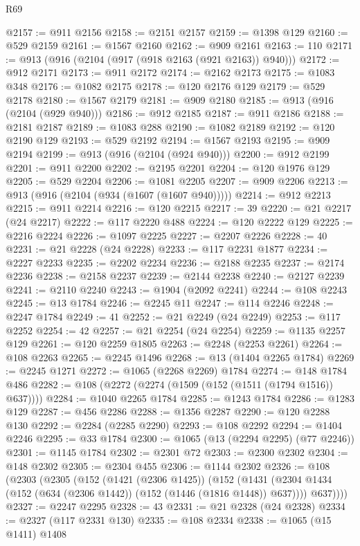 \begin{lexlean}{R69}
\begin{coremodule}
@2157 := @911 @2156
@2158 := @2151 @2157
@2159 := @1398 @129
@2160 := @529 @2159
@2161 := @1567 @2160
@2162 := @909 @2161
@2163 := 110
@2171 := @913 (@916 (@2104 (@917 (@918 @2163 (@921 @2163)) @940)))
@2172 := @912 @2171
@2173 := @911 @2172
@2174 := @2162 @2173
@2175 := @1083 @348
@2176 := @1082 @2175
@2178 := @120 @2176 @129
@2179 := @529 @2178
@2180 := @1567 @2179
@2181 := @909 @2180
@2185 := @913 (@916 (@2104 (@929 @940)))
@2186 := @912 @2185
@2187 := @911 @2186
@2188 := @2181 @2187
@2189 := @1083 @288
@2190 := @1082 @2189
@2192 := @120 @2190 @129
@2193 := @529 @2192
@2194 := @1567 @2193
@2195 := @909 @2194
@2199 := @913 (@916 (@2104 (@924 @940)))
@2200 := @912 @2199
@2201 := @911 @2200
@2202 := @2195 @2201
@2204 := @120 @1976 @129
@2205 := @529 @2204
@2206 := @1081 @2205
@2207 := @909 @2206
@2213 := @913 (@916 (@2104 (@934 (@1607 (@1607 @940)))))
@2214 := @912 @2213
@2215 := @911 @2214
@2216 := @120 @2215
@2217 := 39
@2220 := @21 @2217 (@24 @2217)
@2222 := @117 @2220 @488
@2224 := @120 @2222 @129
@2225 := @2216 @2224
@2226 := @1097 @2225
@2227 := @2207 @2226
@2228 := 40
@2231 := @21 @2228 (@24 @2228)
@2233 := @117 @2231 @1877
@2234 := @2227 @2233
@2235 := @2202 @2234
@2236 := @2188 @2235
@2237 := @2174 @2236
@2238 := @2158 @2237
@2239 := @2144 @2238
@2240 := @2127 @2239
@2241 := @2110 @2240
@2243 := @1904 (@2092 @2241)
@2244 := @108 @2243
@2245 := @13 @1784
@2246 := @2245 @11
@2247 := @114 @2246
@2248 := @2247 @1784
@2249 := 41
@2252 := @21 @2249 (@24 @2249)
@2253 := @117 @2252
@2254 := 42
@2257 := @21 @2254 (@24 @2254)
@2259 := @1135 @2257 @129
@2261 := @120 @2259 @1805
@2263 := @2248 (@2253 @2261)
@2264 := @108 @2263
@2265 := @2245 @1496
@2268 := @13 (@1404 @2265 @1784)
@2269 := @2245 @1271
@2272 := @1065 (@2268 @2269) @1784
@2274 := @148 @1784 @486
@2282 := @108 (@2272 (@2274 (@1509 (@152 (@1511 (@1794 @1516)) @637))))
@2284 := @1040 @2265 @1784
@2285 := @1243 @1784
@2286 := @1283 @129
@2287 := @456 @2286
@2288 := @1356 @2287
@2290 := @120 @2288 @130
@2292 := @2284 (@2285 @2290)
@2293 := @108 @2292
@2294 := @1404 @2246
@2295 := @33 @1784
@2300 := @1065 (@13 (@2294 @2295) (@77 @2246))
@2301 := @1145 @1784
@2302 := @2301 @72
@2303 := @2300 @2302
@2304 := @148 @2302
@2305 := @2304 @455
@2306 := @1144 @2302
@2326 := @108
    (@2303
      (@2305
        (@152
          (@1421 (@2306 @1425))
          (@152
            (@1431 (@2304 @1434 (@152 (@634 (@2306 @1442)) (@152 (@1446 (@1816 @1448)) @637))))
            @637))))
@2327 := @2247 @2295
@2328 := 43
@2331 := @21 @2328 (@24 @2328)
@2334 := @2327 (@117 @2331 @130)
@2335 := @108 @2334
@2338 := @1065 (@15 @1411) @1408

\end{coremodule}
\end{lexlean}
